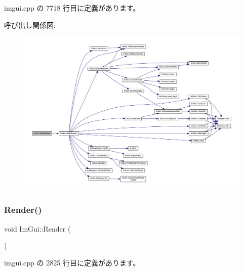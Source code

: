  imgui.\+cpp の 7718 行目に定義があります。

呼び出し関係図\+:\nopagebreak
\begin{figure}[H]
\begin{center}
\leavevmode
\includegraphics[width=350pt]{namespace_im_gui_a018d2b61d2f00bb7a9dd2b1f933b93a5_cgraph}
\end{center}
\end{figure}
\mbox{\label{namespace_im_gui_ab51a164f547317c16c441f1599e3946d}} 
\subsubsection{\texorpdfstring{Render()}{Render()}}
{\footnotesize\ttfamily void Im\+Gui\+::\+Render (\begin{DoxyParamCaption}{ }\end{DoxyParamCaption})}



 imgui.\+cpp の 2825 行目に定義があります。


